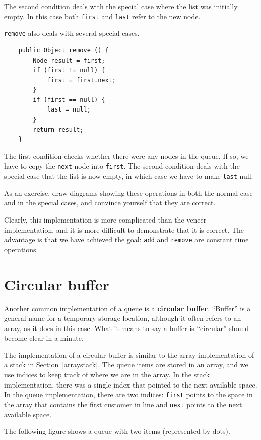 \documentclass[12pt]{book}
\theoremstyle{exercise}
\begin{document}
The second condition deals with the special case where the list
was initially empty.  In this case both {\tt first} and {\tt last}
refer to the new node.

{\tt remove} also deals with several special cases.

\begin{verbatim}
    public Object remove () {
        Node result = first;
        if (first != null) {
            first = first.next;
        }
        if (first == null) {
            last = null;
        }
        return result;
    }
\end{verbatim}
%
The first condition checks whether there were any nodes in
the queue.  If so, we have to copy the {\tt next} node into
{\tt first}.  The second condition deals with the special
case that the list is now empty, in which case we have to
make {\tt last} null.

As an exercise, draw diagrams showing these operations in
both the normal case and in the special cases, and convince
yourself that they are correct.

Clearly, this implementation is more complicated than the
veneer implementation, and it is more difficult to demonstrate
that it is correct.  The advantage is that we have achieved
the goal: {\tt add} and {\tt remove} are constant
time operations.


\section{Circular buffer}

Another common implementation of a queue is a {\bf circular
buffer}.  ``Buffer'' is a general name for a temporary storage
location, although it often refers to an array, as it does in
this case.  What it means to say a buffer is ``circular'' should
become clear in a minute.

The implementation of a circular buffer is similar to the array
implementation of a stack in Section~\ref{arraystack}.  The
queue items are stored in an array, and we use indices to
keep track of where we are in the array.  In the stack implementation,
there was a single index that pointed to the next available space.
In the queue implementation, there are two indices: {\tt first}
points to the space in the array that contains the first customer
in line and {\tt next} points to the next available space.

The following figure shows a queue with two items (represented
by dots).
\end{document}
